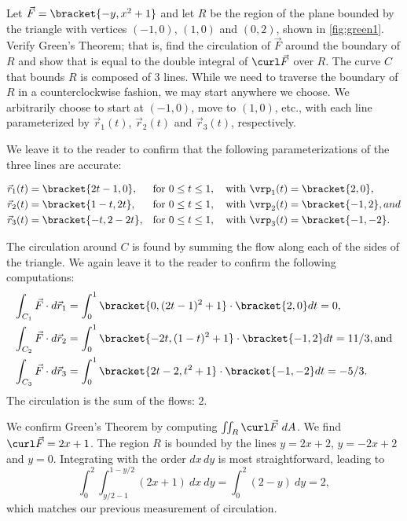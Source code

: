 \begin{example}\label{ex_green1}
Let $\vec F =\bracket{-y,x^2+1}$ and let $R$ be the region of the plane bounded by the triangle with vertices $(-1,0)$, $(1,0)$ and $(0,2)$, shown in \autoref{fig:green1}. Verify Green's Theorem; that is, find the circulation of $\vec F$ around the boundary of $R$ and show that is equal to the double integral of $\curl \vec F$ over $R$.
\solution
The curve $C$ that bounds $R$ is composed of 3 lines. While we need to traverse the boundary of $R$ in a counterclockwise fashion, we may start anywhere we choose. We arbitrarily choose to start at $(-1,0)$, move to $(1,0)$, etc., with each line parameterized by $\vec r_1(t)$, $\vec r_2(t)$ and $\vec r_3(t)$, respectively.

We leave it to the reader to confirm that the following parameterizations of the three lines are accurate:

\begin{align*}
\vec r_1(t) &=\bracket{2t-1,0}, && \text{for }0\leq t\leq 1,\quad\text{with }\vrp_1(t) =\bracket{ 2,0},\\
\vec r_2(t) &=\bracket{1-t,2t}, && \text{for }0\leq t\leq 1,\quad\text{with }\vrp_2(t) =\bracket{ -1,2}, and\\
\vec r_3(t) &=\bracket{-t,2-2t}, && \text{for }0\leq t\leq 1,\quad\text{with } \vrp_3(t) =\bracket{ -1,-2}.
\end{align*}

The circulation around $C$ is found by summing the flow along each of the sides of the triangle. We again leave it to the reader to confirm the following computations:
\begin{align*}
\int_{C_1}\vec F\cdot d\vec r_1 &= \int_0^1\bracket{0,(2t-1)^2+1}\cdot\bracket{2,0}dt = 0,\\
\int_{C_2}\vec F\cdot d\vec r_2 &= \int_0^1\bracket{-2t,(1-t)^2+1}\cdot\bracket{-1,2}dt = 11/3, \text{and}\\
\int_{C_3}\vec F\cdot d\vec r_3 &= \int_0^1\bracket{2t-2,t^2+1}\cdot\bracket{-1,-2}dt = -5/3.
\end{align*}
The circulation is the sum of the flows: $2$.

We confirm Green's Theorem by computing $\iint_R \curl \vec F\ dA$. We find $\curl \vec F = 2x+1$. The region $R$ is bounded by the lines $y = 2x+2$, $y=-2x+2$ and $y=0$. Integrating with the order $dx\, dy$ is most straightforward, leading to
\[\int_0^2\int_{y/2-1}^{1-y/2} (2x+1)\ dx\ dy = \int_0^2 (2-y)\ dy = 2,\]
which matches our previous measurement of circulation.
\end{example}

